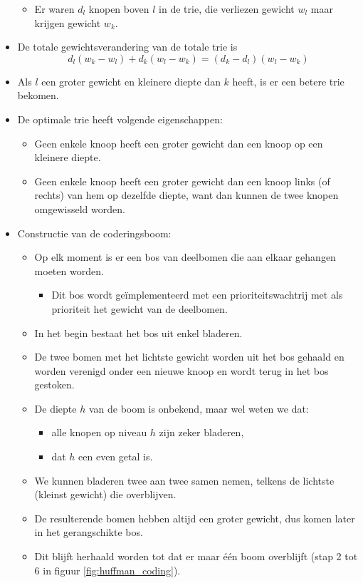 \begin{itemize}
\begin{itemize}
        \item Er waren $d_l$ knopen boven $l$ in de trie, die verliezen gewicht $w_l$ maar krijgen gewicht $w_k$.
    \end{itemize}
    \item De totale gewichtsverandering van de totale trie is 
    $$d_l(w_k - w_l) + d_k(w_l - w_k) = (d_k - d_l)(w_l - w_k)$$
    \item Als $l$ een groter gewicht en kleinere diepte dan $k$ heeft, is er een betere trie bekomen.
    \item De optimale trie heeft volgende eigenschappen:
    \begin{itemize}
        \item Geen enkele knoop heeft een groter gewicht dan een knoop op een kleinere diepte.
        \item Geen enkele knoop heeft een groter gewicht dan een knoop links (of rechts) van hem op dezelfde diepte, want dan kunnen de twee knopen omgewisseld worden.
    \end{itemize}
    \item Constructie van de coderingsboom: 
    \begin{itemize}
        \item Op elk moment is er een bos van deelbomen die aan elkaar gehangen moeten worden.
        \begin{itemize}
            \item Dit bos wordt geïmplementeerd met een prioriteitswachtrij met als prioriteit het gewicht van de deelbomen.
        \end{itemize}
        \item In het begin bestaat het bos uit enkel bladeren.
        \item De twee bomen met het lichtste gewicht worden uit het bos gehaald en worden verenigd onder een nieuwe knoop en wordt terug in het bos gestoken.
        \item De diepte $h$ van de boom is onbekend, maar wel weten we dat:
        \begin{itemize}
            \item alle knopen op niveau $h$ zijn zeker bladeren,
            \item dat $h$ een even getal is.
        \end{itemize}
        \item We kunnen bladeren twee aan twee samen nemen, telkens de lichtste (kleinst gewicht)  die overblijven.
        \item De resulterende bomen hebben altijd een groter gewicht, dus komen later in het gerangschikte bos.
        \item Dit blijft herhaald worden tot dat er maar één boom overblijft (stap 2 tot 6 in figuur \ref{fig:huffman_coding}).
    \end{itemize}
\end{itemize}

